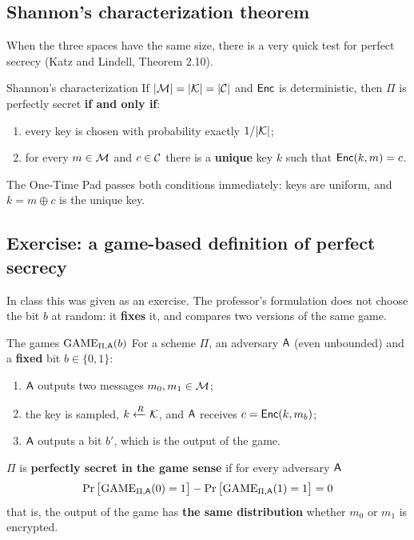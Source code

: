 \subsection{Shannon's characterization theorem}

When the three spaces have the same size, there is a very quick test for perfect secrecy (Katz and Lindell, Theorem 2.10).

\begin{framedthm}{Shannon's characterization}
  If $|\mathcal{M}| = |\mathcal{K}| = |\mathcal{C}|$ and $\mathsf{Enc}$ is deterministic, then $\Pi$ is perfectly secret \textbf{if and only if}:
  \begin{enumerate}
    \item every key is chosen with probability exactly $1/|\mathcal{K}|$;
    \item for every $m \in \mathcal{M}$ and $c \in \mathcal{C}$ there is a \textbf{unique} key $k$ such that $\mathsf{Enc}(k, m) = c$.
  \end{enumerate}
\end{framedthm}

The One-Time Pad passes both conditions immediately: keys are uniform, and $k = m \oplus c$ is the unique key.

\subsection{Exercise: a game-based definition of perfect secrecy}\label{sec:ps-game}

In class this was given as an exercise. The professor's formulation does not choose the bit $b$ at random: it \textbf{fixes} it, and compares two versions of the same game.

\begin{frameddefn}[label={def:ps-game}]{The games $\mathrm{GAME}_{\Pi,\mathsf{A}}(b)$}
  For a scheme $\Pi$, an adversary $\mathsf{A}$ (even unbounded) and a \textbf{fixed} bit $b \in \{0,1\}$:
  \begin{enumerate}
    \item $\mathsf{A}$ outputs two messages $m_0, m_1 \in \mathcal{M}$;
    \item the key is sampled, $k \xleftarrow{R} \mathcal{K}$, and $\mathsf{A}$ receives $c = \mathsf{Enc}(k, m_b)$;
    \item $\mathsf{A}$ outputs a bit $b'$, which is the output of the game.
  \end{enumerate}
  $\Pi$ is \textbf{perfectly secret in the game sense} if for every adversary $\mathsf{A}$
  \[
    \Pr\big[\mathrm{GAME}_{\Pi,\mathsf{A}}(0) = 1\big] - \Pr\big[\mathrm{GAME}_{\Pi,\mathsf{A}}(1) = 1\big] = 0
  \]
  that is, the output of the game has \textbf{the same distribution} whether $m_0$ or $m_1$ is encrypted.
\end{frameddefn}

